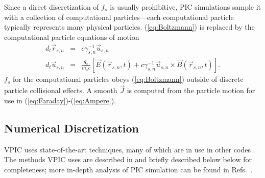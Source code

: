 \documentclass[10pt]{article}
\newcommand{\vecr}{\vec{r}}
\newcommand{\vecu}{\vec{u}}
\newcommand{\vecJ}{\vec{J}}
\newcommand{\vecE}{\vec{E}}
\newcommand{\vecB}{\vec{B}}
\newcommand{\Deriv}[2]{d_{#2}#1}
\newcommand{\CrossP}[2]{#1 \times #2}
\newcommand{\eq}[1]{(\ref{eq:#1})}
\begin{document}
Since a direct discretization of $f_s$ is usually prohibitive, PIC
simulations sample it with a collection of computational
particles---each computational particle typically represents many
physical particles.  \eq{Boltzmann} is replaced by the computational
particle equations of motion
\begin{eqnarray}
\Deriv{\vecr_{s,n}}{t} &=& c \gamma_{s,n}^{-1} \vecu_{s,n} \label{eq:Position}\\
\Deriv{\vecu_{s,n}}{t} &=& \frac{q_s}{m_s c} \left[
\vecE\left(\vecr_{s,n},t\right) +
\CrossP{c\gamma_{s,n}^{-1}\vecu_{s,n}}{\vecB\left(\vecr_{s,n},t\right)}
\right] \label{eq:Momentum}
.
\end{eqnarray}
$f_s$ for the computational particles obeys \eq{Boltzmann} outside of
discrete particle collisional effects.  A smooth $\vecJ$ is computed
from the particle motion for use in \eq{Faraday}-\eq{Ampere}.

\subsection{Numerical Discretization}

VPIC uses state-of-the-art techniques, many of which are in use in
other codes
\cite{Kwan_Snell_1985,Verboncoeur_et_al_1995,Eastwood_et_al_1995,Jones_et_al_1996,Blahovec_et_al_2000,Nieter_Cary_2004}.
The methods VPIC uses are described in
\cite{Bowers_et_al_Phys_Plasmas_2007} and briefly described below
below for completeness; more in-depth analysis of PIC simulation can
be found in Refs.~\cite{Birdsall_Langdon_1985,Hockney_Eastwood_1988}.
\end{document}
